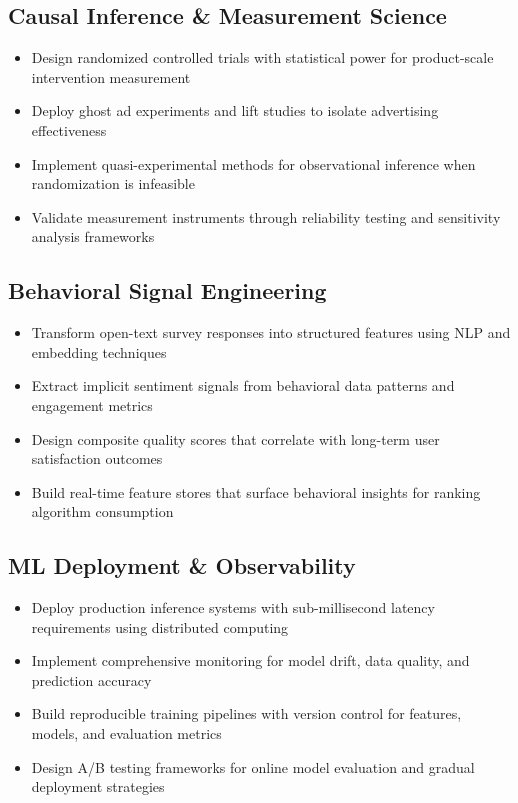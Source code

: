 \documentclass[11pt,a4paper]{article}
\begin{document}
\subsection*{Causal Inference \& Measurement Science}
\begin{itemize}
    \item Design randomized controlled trials with statistical power for product-scale intervention measurement
    \item Deploy ghost ad experiments and lift studies to isolate advertising effectiveness
    \item Implement quasi-experimental methods for observational inference when randomization is infeasible
    \item Validate measurement instruments through reliability testing and sensitivity analysis frameworks
\end{itemize}

\subsection*{Behavioral Signal Engineering}
\begin{itemize}
    \item Transform open-text survey responses into structured features using NLP and embedding techniques
    \item Extract implicit sentiment signals from behavioral data patterns and engagement metrics
    \item Design composite quality scores that correlate with long-term user satisfaction outcomes
    \item Build real-time feature stores that surface behavioral insights for ranking algorithm consumption
\end{itemize}

\subsection*{ML Deployment \& Observability}
\begin{itemize}
    \item Deploy production inference systems with sub-millisecond latency requirements using distributed computing
    \item Implement comprehensive monitoring for model drift, data quality, and prediction accuracy
    \item Build reproducible training pipelines with version control for features, models, and evaluation metrics
    \item Design A/B testing frameworks for online model evaluation and gradual deployment strategies
\end{itemize}
\end{document}
